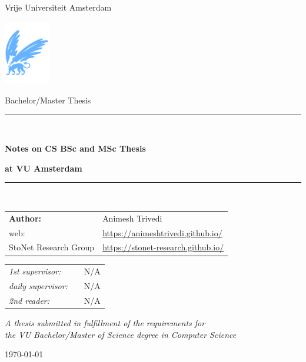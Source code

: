 \documentclass[11pt]{article}
\begin{document}
\thispagestyle{empty}

\begin{center}

Vrije Universiteit Amsterdam

\vspace{1mm}

\includegraphics[height=28mm]{vu-griffioen.pdf}

\vspace{1.5cm}

{\Large Bachelor/Master Thesis}

\vspace*{1.5cm}

\rule{.9\linewidth}{.6pt}\\[0.4cm]
{\huge \bfseries Notes on CS BSc and MSc Thesis \par}
{\huge \bfseries  at VU Amsterdam \par}\vspace{0.4cm}
\rule{.9\linewidth}{.6pt}\\[1.5cm]

\vspace*{2mm}

{\normalsize 
\begin{tabular}{ll}
{\bf Author:} & Animesh Trivedi \\
web: & \url{https://animeshtrivedi.github.io/} \\ 
StoNet Research Group & \url{https://stonet-research.github.io/} \\ 
\end{tabular}
}


\vspace*{1.5cm}

\begin{tabular}{ll}
{\it 1st supervisor:}   & ~~N/A \\
{\it daily supervisor:} & ~~N/A \\
{\it 2nd reader:}       & ~~N/A 
\end{tabular}

\vspace*{2cm}

\textit{A thesis submitted in fulfillment of the requirements for\\ the VU Bachelor/Master of Science degree in Computer Science }

\vspace*{1cm}

\today\\[4cm] %

\end{center}
\end{document}
